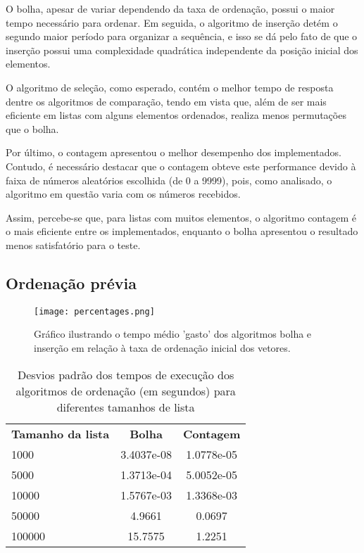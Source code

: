 O bolha, apesar de variar dependendo da taxa de ordenação, possui o maior tempo necessário para ordenar. Em seguida, o algoritmo de inserção detém o segundo maior período para organizar a sequência, e isso se dá pelo fato de que o inserção possui uma complexidade quadrática independente da posição inicial dos elementos. 

O algoritmo de seleção, como esperado, contém o melhor tempo de resposta dentre os algoritmos de comparação, tendo em vista que, além de ser mais eficiente em listas com alguns elementos ordenados, realiza menos permutações que o bolha. 

Por último, o contagem apresentou o melhor desempenho dos implementados. Contudo, é necessário destacar que o contagem obteve este performance devido à faixa de números aleatórios escolhida (de 0 a 9999), pois, como analisado, o algoritmo em questão varia com os números recebidos.

Assim, percebe-se que, para listas com muitos elementos, o algoritmo contagem é o mais eficiente entre os implementados, enquanto o bolha apresentou o resultado menos satisfatório para o teste.


\subsection{Ordenação prévia}
\begin{figure}[h]
    \texttt{[image: percentages.png]}
    \caption{Gráfico ilustrando o tempo médio 'gasto' dos algoritmos bolha e inserção em relação à taxa de ordenação inicial dos vetores.}
\end{figure}
\begin{table}[h]
    \begin{tabular}{lcc}
        \textbf{Tamanho da lista} & \textbf{Bolha} & \textbf{Contagem} \\
        1000 & 3.4037e-08 & 1.0778e-05 \\
        5000 & 1.3713e-04 & 5.0052e-05 \\
        10000 & 1.5767e-03 & 1.3368e-03 \\
        50000 & 4.9661 & 0.0697 \\
        100000 & 15.7575 & 1.2251 \\
    \end{tabular}
    \caption{Desvios padrão dos tempos de execução dos algoritmos de ordenação (em segundos) para diferentes tamanhos de lista}
    \label{tab:desvios_algoritmos}
\end{table}

